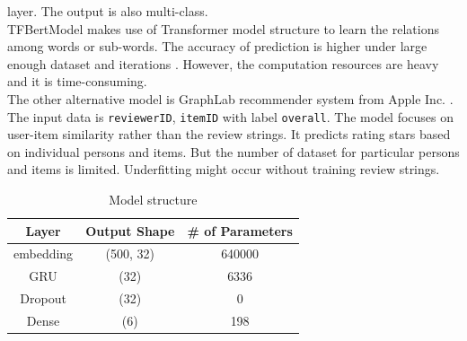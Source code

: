 \documentclass[12pt]{article}
\begin{document}
layer. The output is also multi-class.\\
TFBertModel makes use of Transformer model structure to learn the relations among words or sub-words.
The accuracy of prediction is higher under large enough dataset and iterations \cite{BERTpros}. 
However, the computation resources are heavy and it is time-consuming.\\
The other alternative model is GraphLab recommender system from Apple Inc. \cite{graph}. 
The input data is \texttt{reviewerID}, \texttt{itemID} with label \texttt{overall}.
The model focuses on user-item similarity rather than the review strings. It predicts rating stars based on individual
persons and items. But the number of dataset for particular persons and items is limited. Underfitting might occur
without training review strings.
\begin{table}[h!]
    \centering
        \begin{tabular}{|c|c|c|}
        \hline
        Layer & Output Shape & \# of Parameters \\
        \hline 
        embedding & (500, 32) & 640000 \\
        \hline
        GRU &                   (32) &               6336 \\
        \hline
        Dropout &                   (32) &               0 \\
        \hline
        Dense  &               (6)     &            198  \\
        \hline
        \end{tabular}
    \caption{Model structure}
    \label{table:ms}
\end{table}
\end{document}
